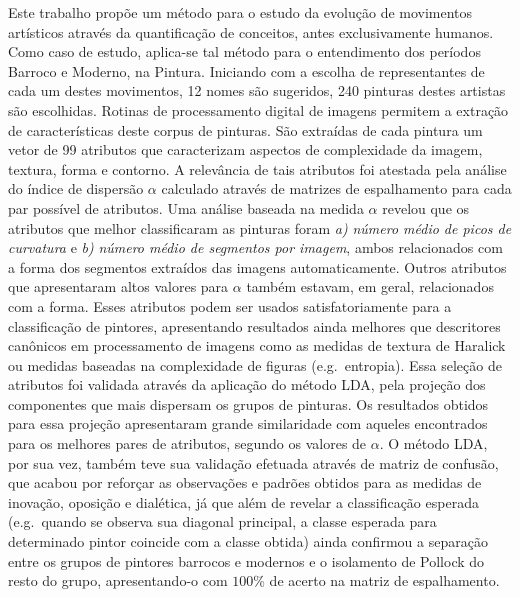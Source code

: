 

Este trabalho propõe um método para o estudo da evolução de movimentos
artísticos através da quantificação de conceitos, antes exclusivamente
humanos. Como caso de estudo, aplica-se tal método para o entendimento
dos períodos Barroco e Moderno, na Pintura. Iniciando com a escolha de
representantes de cada um destes movimentos, 12 nomes são sugeridos,
240 pinturas destes artistas são escolhidas. Rotinas de processamento
digital de imagens permitem a extração de características deste corpus
de pinturas. São extraídas de cada pintura um vetor de 99 atributos
que caracterizam aspectos de complexidade da imagem, textura, forma e
contorno.  A relevância de tais atributos foi atestada pela análise do
índice de dispersão $\alpha$ calculado através de matrizes de
espalhamento para cada par possível de atributos. Uma análise baseada
na medida $\alpha$ revelou que os atributos que melhor classificaram
as pinturas foram \textit{a)} \emph{número médio de picos de
  curvatura} e \textit{b)} \emph{número médio de segmentos por
  imagem}, ambos relacionados com a forma dos segmentos extraídos das
imagens automaticamente. Outros atributos que apresentaram altos
valores para $\alpha$ também estavam, em geral, relacionados com a
forma. Esses atributos podem ser usados satisfatoriamente para a
classificação de pintores, apresentando resultados ainda melhores que
descritores canônicos em processamento de imagens como as medidas de
textura de Haralick ou medidas baseadas na complexidade de figuras
(e.g.\ entropia). Essa seleção de atributos foi validada através da
aplicação do método LDA, pela projeção dos componentes que mais
dispersam os grupos de pinturas. Os resultados obtidos para essa
projeção apresentaram grande similaridade com aqueles encontrados para
os melhores pares de atributos, segundo os valores de $\alpha$. O
método LDA, por sua vez, também teve sua validação efetuada através de
matriz de confusão, que acabou por reforçar as observações e padrões
obtidos para as medidas de inovação, oposição e dialética, já que além
de revelar a classificação esperada (e.g.\ quando se observa sua
diagonal principal, a classe esperada para determinado pintor coincide
com a classe obtida) ainda confirmou a separação entre os grupos de
pintores barrocos e modernos e o isolamento de Pollock do resto do
grupo, apresentando-o com $100\%$ de acerto na matriz de espalhamento.

